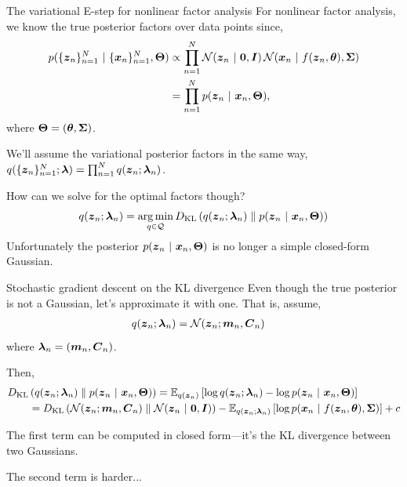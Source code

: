 \documentclass[aspectratio=169]{beamer}
\begin{document}
\begin{frame}{The variational E-step for nonlinear factor analysis}
For nonlinear factor analysis, we know the true posterior factors over data points since,
\begin{align}
    p(\{\boldsymbol{z}_n\}_{n=1}^N ~\vert~ \{\boldsymbol{x}_n\}_{n=1}^N, \boldsymbol{\Theta})
    &\propto \prod_{n=1}^N \mathcal{N}(\boldsymbol{z}_n ~\vert~ \boldsymbol{0}, \boldsymbol{I}) \, \mathcal{N}(\boldsymbol{x}_n ~\vert~ f(\boldsymbol{z}_n, \boldsymbol{\theta}), \boldsymbol{\Sigma}) \\
    &= \prod_{n=1}^N p(\boldsymbol{z}_n ~\vert~ \boldsymbol{x}_n, \boldsymbol{\Theta}),
\end{align}
where $\boldsymbol{\Theta} = (\boldsymbol{\theta}, \boldsymbol{\Sigma})$.

We'll assume the variational posterior factors in the same way,  $q(\{\boldsymbol{z}_n\}_{n=1}^N; \boldsymbol{\lambda}) = \prod_{n=1}^N q(\boldsymbol{z}_n; \boldsymbol{\lambda}_n)$.

How can we solve for the optimal factors though?
\begin{align}
    q(\boldsymbol{z}_n; \boldsymbol{\lambda}_n) 
    = \operatorname*{arg\,min}_{q \in \mathcal{Q}} D_{\textrm{KL}}\left(q(\boldsymbol{z}_n; \boldsymbol{\lambda}_n)\;\|\;p(\boldsymbol{z}_n ~\vert~ \boldsymbol{x}_n, \boldsymbol{\Theta})\right)
\end{align}
Unfortunately the posterior $p(\boldsymbol{z}_n ~\vert~ \boldsymbol{x}_n, \boldsymbol{\Theta})$ is no longer a simple closed-form Gaussian.

\end{frame}

\begin{frame}{Stochastic gradient descent on the KL divergence}
Even though the true posterior is not a Gaussian, let's approximate it with one.  That is, assume,
\begin{align}
    q(\boldsymbol{z}_n ; \boldsymbol{\lambda}_n) &= \mathcal{N}(\boldsymbol{z}_n; \boldsymbol{m}_n, \boldsymbol{C}_n)
\end{align}
where $\boldsymbol{\lambda}_n = (\boldsymbol{m}_n, \boldsymbol{C}_n)$.

Then,
\begin{align}
    &D_{\textrm{KL}}\left(q(\boldsymbol{z}_n; \boldsymbol{\lambda}_n)\;\|\;p(\boldsymbol{z}_n ~\vert~ \boldsymbol{x}_n, \boldsymbol{\Theta})\right)
    = \mathbb{E}_{q(\boldsymbol{z}_n)}\left[\log q(\boldsymbol{z}_n; \boldsymbol{\lambda}_n) - \log p(\boldsymbol{z}_n ~\vert~ \boldsymbol{x}_n, \boldsymbol{\Theta}) \right] \\
    \label{eq:kl}
    &\qquad = D_{\textrm{KL}}\left(\mathcal{N}(\boldsymbol{z}_n; \boldsymbol{m}_n, \boldsymbol{C}_n)\;\|\;\mathcal{N}(\boldsymbol{z}_n ~\vert~ \boldsymbol{0}, \boldsymbol{I})\right) - \mathbb{E}_{q(\boldsymbol{z}_n; \boldsymbol{\lambda}_n)} \left[\log p(\boldsymbol{x}_n ~\vert~ f(\boldsymbol{z}_n, \boldsymbol{\theta}), \boldsymbol{\Sigma}) \right]  + c
\end{align}

The first term can be computed in closed form---it's the KL divergence between two Gaussians. 

The second term is harder...
\end{frame}
\end{document}
